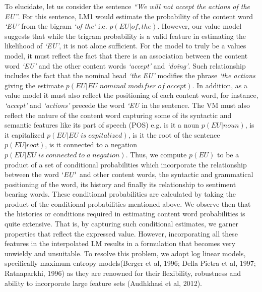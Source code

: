 To elucidate, let us consider the sentence \textit{``We will not accept the actions of the EU''}.
For this sentence, LM1 would estimate the probability of the content word \textit{`EU'} from the bigram \textit{`of the'} i.e. $p(EU|of,the)$. However, our value model suggests that while the trigram probability is a valid feature in estimating the likelihood of \textit{`EU'}, it is not alone sufficient. For the model to truly be a values model, it must reflect the fact that there is an association between the content word \textit{`EU'} and the other content words \textit{`accept'} and \textit{`doing'}. Such relationship includes the fact that the nominal head \textit{`the EU'} modifies the phrase \textit{`the actions} giving the estimate $p(EU|EU\; nominal\; modifier \;of \;accept)$. In addition, as a value model it must also reflect the positioning of each content word, for instance, \textit{`accept'} and \textit{`actions'} precede the word \textit{`EU} in the sentence. The VM must also reflect the nature of the content word capturing some of its syntactic and semantic features like its part of speech (POS) e.g. is it a noun $p(EU|noun)$, is it capitalized $p(EU|EU\; is\; capitalized)$, is it the root of the sentence $p(EU|root)$, is it connected to a negation $p(EU|EU\; is\; connected\; to\; a\; negation)$. Thus, we compute $p(EU)$ to be a product of a set of conditional probabilities which incorporate the relationship between the word $`EU'$ and other content words, the syntactic and grammatical positioning of the word, its history and finally its relationship to sentiment bearing words. These conditional probabilities are calculated by taking the product of the conditional probabilities mentioned above. 
We observe then that the histories or conditions required in estimating content word probabilities is quite extensive. That is, by capturing such conditional estimates, we garner properties that reflect the expressed value. However, incorporating all these features in the interpolated LM results in a formulation that becomes very unwieldy  and unsuitable. To resolve this problem, we adopt log linear models, specifically maximum entropy models(Berger et al, 1996; Della Pietra et al, 1997; Ratnaparkhi, 1996) as they are renowned for their flexibility, robustness and ability to incorporate large feature sets (Audhkhasi et al, 2012). 


